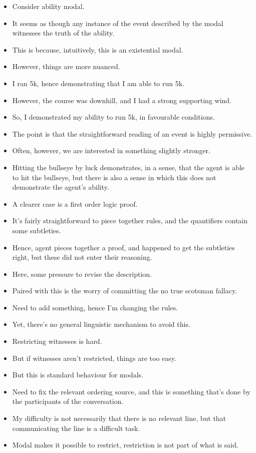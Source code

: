 \documentclass[10pt]{article}
\begin{document}
\begin{itemize}
\item Consider ability modal.
\item It seems as though any instance of the event described by the modal witnesses the truth of the ability.
\item This is because, intuitively, this is an existential modal.
\item However, things are more nuanced.
\item I ran 5k, hence demonstrating that I am able to run 5k.
\item However, the course was downhill, and I had a strong supporting wind.
\item So, I demonstrated my ability to run 5k, in favourable conditions.
\item The point is that the straightforward reading of an event is highly permissive.
\item Often, however, we are interested in something slightly stronger.
\item Hitting the bullseye by luck demonstrates, in a sense, that the agent is able to hit the bullseye, but there is also a sense in which this does not demonstrate the agent's ability.
\item A clearer case is a first order logic proof.
\item It's fairly straightforward to piece together rules, and the quantifiers contain some subtleties.
\item Hence, agent pieces together a proof, and happened to get the subtleties right, but these did not enter their reasoning.
\item Here, some pressure to revise the description.
\item Paired with this is the worry of committing the no true scotsman fallacy.
\item Need to add something, hence I'm changing the rules.
\item Yet, there's no general linguistic mechanism to avoid this.
\item Restricting witnesses is hard.
\item But if witnesses aren't restricted, things are too easy.
\item But this is standard behaviour for modals.
\item Need to fix the relevant ordering source, and this is something that's done by the participants of the conversation.
\item My difficulty is not necessarily that there is no relevant line, but that communicating the line is a difficult task.
\item Modal makes it possible to restrict, restriction is not part of what is said.
\end{itemize}
\end{document}
